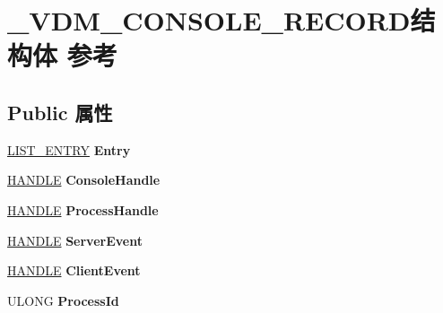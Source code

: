 \hypertarget{struct___v_d_m___c_o_n_s_o_l_e___r_e_c_o_r_d}{}\section{\+\_\+\+V\+D\+M\+\_\+\+C\+O\+N\+S\+O\+L\+E\+\_\+\+R\+E\+C\+O\+R\+D结构体 参考}
\label{struct___v_d_m___c_o_n_s_o_l_e___r_e_c_o_r_d}
\subsection*{Public 属性}
\begin{DoxyCompactItemize}
\item 
\mbox{\label{struct___v_d_m___c_o_n_s_o_l_e___r_e_c_o_r_d_aaaf65688d2b0da94662ef1c393e2523e}} 
\hyperlink{struct___l_i_s_t___e_n_t_r_y}{L\+I\+S\+T\+\_\+\+E\+N\+T\+RY} {\bfseries Entry}
\item 
\mbox{\label{struct___v_d_m___c_o_n_s_o_l_e___r_e_c_o_r_d_a89a193a8a100f09d7616c54f3c13f83e}} 
\hyperlink{interfacevoid}{H\+A\+N\+D\+LE} {\bfseries Console\+Handle}
\item 
\mbox{\label{struct___v_d_m___c_o_n_s_o_l_e___r_e_c_o_r_d_a36d6f1d28df81ed7a31fa3d5cbb478e5}} 
\hyperlink{interfacevoid}{H\+A\+N\+D\+LE} {\bfseries Process\+Handle}
\item 
\mbox{\label{struct___v_d_m___c_o_n_s_o_l_e___r_e_c_o_r_d_a2f0b05b7462d87abd191adff998bdde6}} 
\hyperlink{interfacevoid}{H\+A\+N\+D\+LE} {\bfseries Server\+Event}
\item 
\mbox{\label{struct___v_d_m___c_o_n_s_o_l_e___r_e_c_o_r_d_ae86081ed6f1c82c7cde4bc07e2ba63e8}} 
\hyperlink{interfacevoid}{H\+A\+N\+D\+LE} {\bfseries Client\+Event}
\item 
\mbox{\label{struct___v_d_m___c_o_n_s_o_l_e___r_e_c_o_r_d_ae5d482127d0f6556feee39bcf123436f}} 
U\+L\+O\+NG {\bfseries Process\+Id}
\item 

\end{DoxyCompactItemize}
